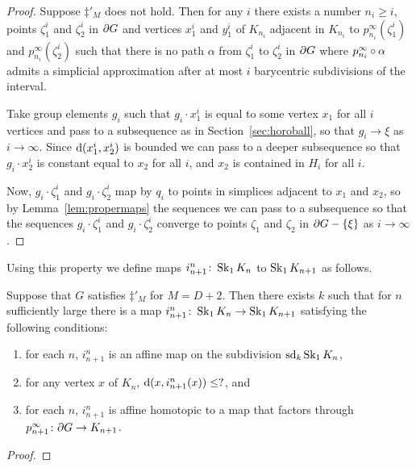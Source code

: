 \documentclass[a4paper]{article}
\begin{document}
\begin{proof}
  Suppose $\ddag'_M$ does not hold. Then for any $i$ there exists a number $n_i
  \geq i$, points $\zeta_1^i$ and $\zeta_2^i$ in $\partial G$ and vertices
  $x_1^i$ and $y_1^i$ of $K_{n_i}$ adjacent in $K_{n_i}$ to
  $p^\infty_{n_i}(\zeta^i_1)$ and $p^\infty_{n_i}(\zeta^i_2)$ such that there
  is no path $\alpha$ from $\zeta_1^i$ to $\zeta_2^i$ in $\partial G$ where
  $p^\infty_{n_i}\circ\alpha$ admits a simplicial approximation after at
  most $i$ barycentric subdivisions of the interval.

  Take group elements $g_i$ such that $g_i\cdot x_1^i$ is equal to some vertex
  $x_1$ for all $i$ vertices and pass to a subsequence as in
  Section~\ref{sec:horoball}, so that $g_i\to\xi$ as $i \to\infty$. Since
  $\operatorname{d}(x_1^i, x_2^i)$ is bounded we can pass to a deeper subsequence so that
  $g_i\cdot x_2^i$ is constant equal to $x_2$ for all $i$, and $x_2$ is
  contained in $H_i$ for all $i$. 

  Now, $g_i\cdot \zeta_1^i$ and $g_i\cdot\zeta_2^i$ map by $q_i$ to points in
  simplices adjacent to $x_1$ and $x_2$, so by Lemma~\ref{lem:propermaps} the
  sequences we can pass to a subsequence so that the sequences $g_i\cdot
  \zeta_1^i$ and $g_i\cdot\zeta_2^i$ converge to points $\zeta_1$ and $\zeta_2$
  in $\partial G - \left\{\xi\right\}$ as $i \to \infty$.
\end{proof}

Using this property we define maps $i^n_{n+1}\colon \operatorname{Sk}_1 K_n$ to
$\operatorname{Sk}_1K_{n+1}$ as follows.

\begin{proposition}
  Suppose that $G$ satisfies $\ddag'_M$ for $M = D+2$. Then there exists $k$
  such that for $n$ sufficiently large there is a map
  $i^n_{n+1}\colon \operatorname{Sk}_1 K_n \to \operatorname{Sk}_1 K_{n+1}$ satisfying the following
  conditions:
  \begin{enumerate}
    \item for each $n$, $i^n_{n+1}$ is an affine map on the subdivision
      $\operatorname{sd}_k\operatorname{Sk}_1 K_n$,
    \item for any vertex $x$ of $K_n$, $\operatorname{d}(x, i^n_{n+1}(x)) \leq ?$, and
    \item for each $n$, $i^n_{n+1}$ is affine homotopic to a map that factors
      through $p^\infty_{n+1}\colon \partial G \to K_{n+1}$.
  \end{enumerate}
\end{proposition}

\begin{proof}
\end{proof}
\end{document}
